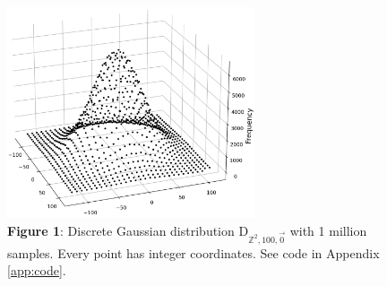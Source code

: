 \begin{figure}
    \centering
    \hypertarget{fig:discrete-gauss}{}
    \includegraphics[width=0.65\textwidth]{figures/D-G-2d-a_is_100-n_1000000.pdf}
    \caption*{\textbf{Figure 1}: Discrete Gaussian distribution $\textrm{D}_{\mathbb{Z}^2, 100, \vec{0}}$ with 1 million samples. Every point has integer coordinates. See code in Appendix \ref{app:code}.}
\end{figure}

